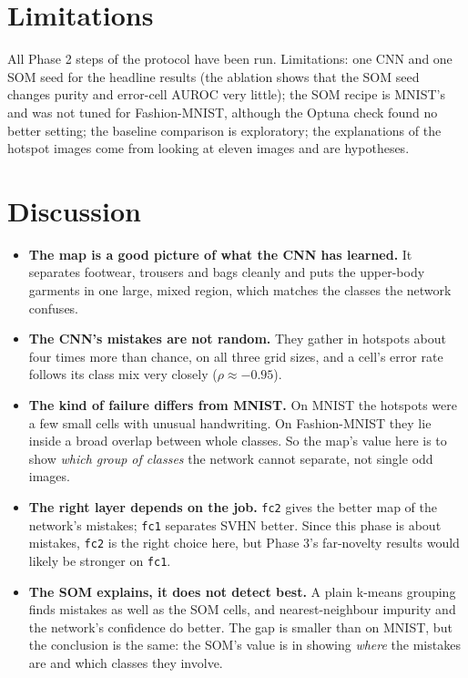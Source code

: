 \documentclass[11pt]{article}
\begin{document}
\section{Limitations}\label{sec:open}

All Phase 2 steps of the protocol have been run. Limitations: one CNN and one SOM seed for the headline results (the ablation shows that the SOM seed changes purity and error-cell AUROC very little); the SOM recipe is MNIST's and was not tuned for Fashion-MNIST, although the Optuna check found no better setting; the baseline comparison is exploratory; the explanations of the hotspot images come from looking at eleven images and are hypotheses.

\section{Discussion}
\begin{itemize}[leftmargin=1.4em, itemsep=2pt]
\item \textbf{The map is a good picture of what the CNN has learned.} It separates footwear, trousers and bags cleanly and puts the upper-body garments in one large, mixed region, which matches the classes the network confuses.
\item \textbf{The CNN's mistakes are not random.} They gather in hotspots about four times more than chance, on all three grid sizes, and a cell's error rate follows its class mix very closely ($\rho\approx-0.95$).
\item \textbf{The kind of failure differs from MNIST.} On MNIST the hotspots were a few small cells with unusual handwriting. On Fashion-MNIST they lie inside a broad overlap between whole classes. So the map's value here is to show \emph{which group of classes} the network cannot separate, not single odd images.
\item \textbf{The right layer depends on the job.} \texttt{fc2} gives the better map of the network's mistakes; \texttt{fc1} separates SVHN better. Since this phase is about mistakes, \texttt{fc2} is the right choice here, but Phase 3's far-novelty results would likely be stronger on \texttt{fc1}.
\item \textbf{The SOM explains, it does not detect best.} A plain k-means grouping finds mistakes as well as the SOM cells, and nearest-neighbour impurity and the network's confidence do better. The gap is smaller than on MNIST, but the conclusion is the same: the SOM's value is in showing \emph{where} the mistakes are and which classes they involve.
\end{itemize}
\end{document}

